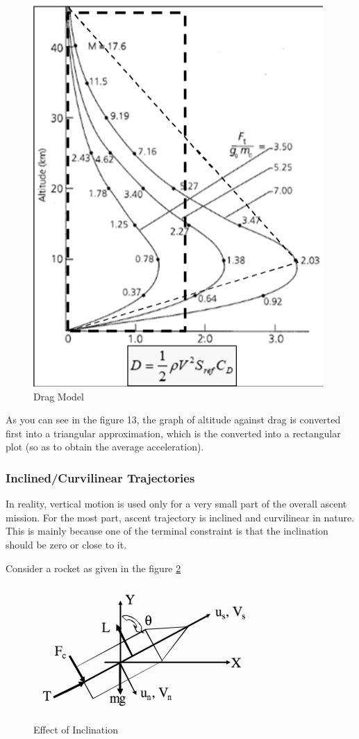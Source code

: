 \documentclass{article}
\theoremstyle{definition}
\begin{document}
\begin{figure}[h]
    \centering
    \includegraphics[scale=0.6]{image 13.png}
    \caption{Drag Model}
    \label{drag model}
\end{figure}

As you can see in the figure 13, the graph of altitude against drag is converted first into a triangular approximation, which is the converted into a rectangular plot (so as to obtain the average acceleration).


\subsubsection{Inclined/Curvilinear Trajectories}

In reality, vertical motion is used only for a very small part of the overall ascent mission. 
For the most part, ascent trajectory is inclined and curvilinear in nature.
This is mainly because one of the terminal constraint is that the inclination should be zero or close to it. \medskip

Consider a rocket as given in the figure \ref{fig:inclination}

\begin{figure}[h]
    \centering
    \includegraphics[scale=0.6]{image 12.png}
    \caption{Effect of Inclination}
    \label{fig:inclination}
\end{figure}
\end{document}
